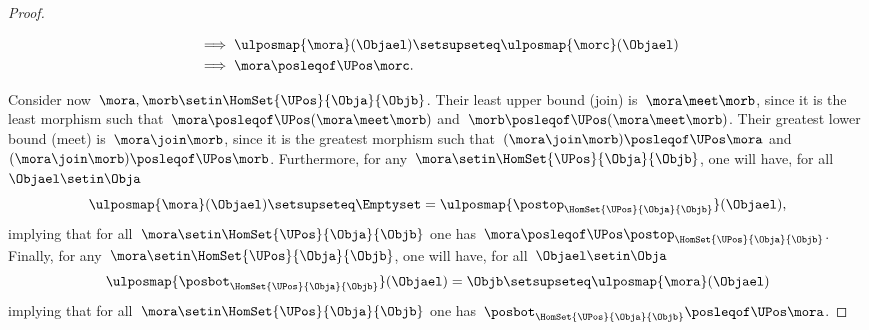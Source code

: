 \begin{proof}
\begin{itemize}
\begin{equation}
\begin{aligned}
                       & \implies \ulposmap{\mora}(\Objael) \setsupseteq \ulposmap{\morc}(\Objael) \\
                       & \implies \mora \posleqof\UPos \morc.
                  \end{aligned}
              \end{equation}
    \end{itemize}
    Consider now~$\mora,\morb \setin \HomSet{\UPos}{\Obja}{\Objb}$.
    Their least upper bound (join) is~$\mora \meet \morb$, since it is the least morphism such that~$\mora \posleqof\UPos (\mora \meet \morb)$ and~$\morb \posleqof\UPos (\mora \meet \morb)$.
    Their greatest lower bound (meet) is~$\mora \join \morb$, since it is the greatest morphism such that~$(\mora \join \morb)\posleqof\UPos \mora $ and~$(\mora \join \morb)\posleqof\UPos \morb$.
    Furthermore, for any~$\mora \setin \HomSet{\UPos}{\Obja}{\Objb}$, one will have, for all~$\Objael \setin \Obja$
    \begin{equation}
        \ulposmap{\mora}(\Objael) \setsupseteq \Emptyset=\ulposmap{\postop_{\HomSet{\UPos}{\Obja}{\Objb}}}(\Objael),
    \end{equation}
    implying that for all~$\mora \setin \HomSet{\UPos}{\Obja}{\Objb}$ one has~$\mora \posleqof\UPos \postop_{\HomSet{\UPos}{\Obja}{\Objb}}$.
    Finally, for any~$\mora \setin \HomSet{\UPos}{\Obja}{\Objb}$, one will have, for all~$\Objael \setin \Obja$
    \begin{equation}
        \ulposmap{\posbot_{\HomSet{\UPos}{\Obja}{\Objb}}}(\Objael)=\Objb \setsupseteq \ulposmap{\mora}(\Objael)
    \end{equation}
    implying that for all~$\mora \setin \HomSet{\UPos}{\Obja}{\Objb}$ one has~$\posbot_{\HomSet{\UPos}{\Obja}{\Objb}}\posleqof\UPos \mora$.
\end{proof}

